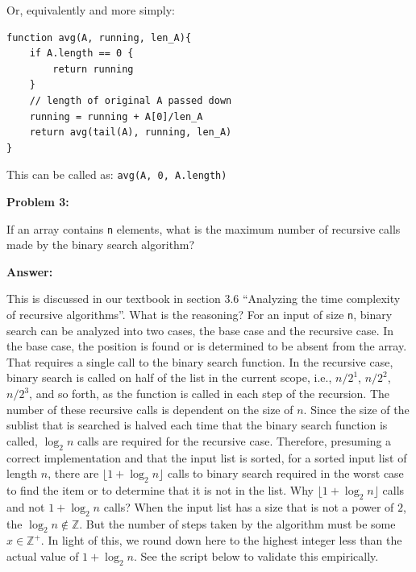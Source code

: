 \documentclass[10pt,letterpaper,final]{report}
\begin{document}
Or, equivalently and more simply:

\begin{mdframed}
\begin{verbatim}
function avg(A, running, len_A){
    if A.length == 0 {
        return running
    }
    // length of original A passed down
    running = running + A[0]/len_A
    return avg(tail(A), running, len_A)
}
\end{verbatim}
\end{mdframed}

This can be called as: \verb|avg(A, 0, A.length)|


\pagebreak
\noindent\textbf{Problem 3:}

If an array contains \verb|n| elements, what is the maximum number of recursive calls made by the binary search algorithm?

\noindent\textbf{Answer:}

This is discussed in our textbook \cite{zybooks-ds2026} in section 3.6 ``Analyzing the time complexity of recursive algorithms''. What is the reasoning? For an input of size \verb|n|, binary search can be analyzed into two cases, the base case and the recursive case. In the base case, the position is found or is determined to be absent from the array. That requires a single call to the binary search function. In the recursive case, binary search is called on half of the list in the current scope, i.e., $n/{2}^1$, $n/{2}^2$, $n/{2}^3$, and so forth, as the function is called in each step of the recursion. The number of these recursive calls is dependent on the size of $n$. Since the size of the sublist that is searched is halved each time that the binary search function is called, $\log_{2}n$ calls are required for the recursive case. Therefore, presuming a correct implementation and that the input list is sorted, for a sorted input list of length $n$, there are $\lfloor 1 + \log_{2}n \rfloor$ calls to binary search required in the worst case to find the item or to determine that it is not in the list. Why $\lfloor 1 + \log_{2}n \rfloor$ calls and not $1 + \log_{2}n$ calls? When the input list has a size that is not a power of $2$, the $\log_{2}n \not \in \mathbb{Z}$. But the number of steps taken by the algorithm must be some $x \in \mathbb{Z}^+$. In light of this, we round down here to the highest integer less than the actual value of $1 + \log_{2}n$. See the script below to validate this empirically.

\inputminted[breaklines=true,fontsize=\footnotesize]{python}{m3p3-bs.py}
\end{document}
